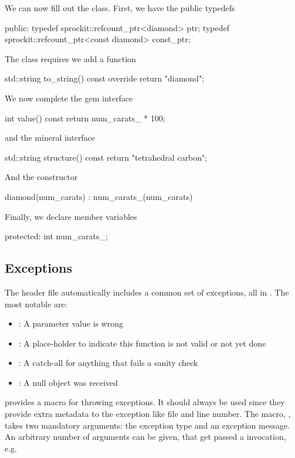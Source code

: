 We can now fill out the class.  First, we have the public typedefs

\begin{CppCode}
 public:
  typedef sprockit::refcount_ptr<diamond> ptr;
  typedef sprockit::refcount_ptr<const diamond> const_ptr;
\end{CppCode}


The  class requires we add a  function

\begin{CppCode}
std::string
to_string() const override {
  return "diamond";
}
\end{CppCode}

We now complete the gem interface

\begin{CppCode}
int
value() const {
  return num_carats_ * 100;
}
\end{CppCode}

and the mineral interface
\begin{CppCode}
std::string
structure() const {
  return "tetrahedral carbon";
}
\end{CppCode}

And the constructor

\begin{CppCode}
  diamond(num_carats)
   : num_carats_(num_carats)
{
}
\end{CppCode}

Finally, we declare member variables

\begin{CppCode}
 protected:
  int num_carats_;
\end{CppCode}


\subsection{Exceptions}
\label{classes:style:basic:exceptions}

The  header file automatically includes a common set of exceptions, all in .
The most notable are:
\begin{itemize}
\item {}: A parameter value is wrong
\item {}: A place-holder to indicate this function is not valid or not yet done
\item {}: A catch-all for anything that fails a sanity check
\item {}: A null object was received
\end{itemize}
\sprockit provides a macro for throwing exceptions.
It should always be used since they provide extra metadata to the exception like file and line number.
The macro, , takes two mandatory arguments: the exception type and an exception message.
An arbitrary number of arguments can be given, that get passed a  invocation, e.g.


